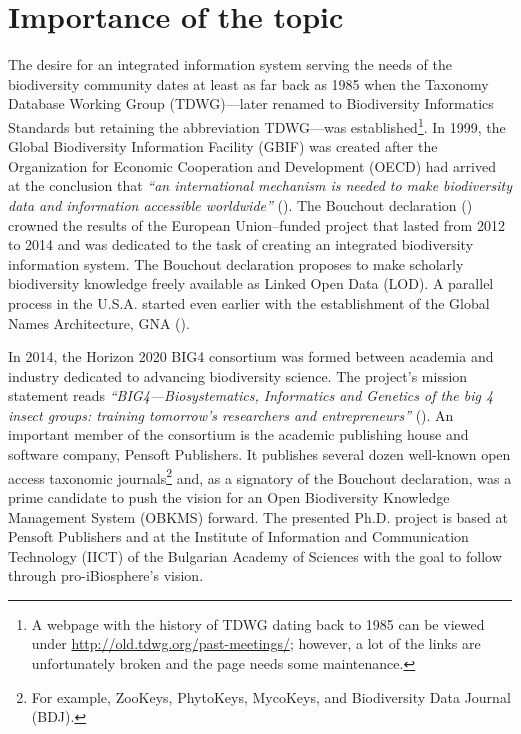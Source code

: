\label{chapter-introduction} 
\newcommand{\keyword}[1]{\textbf{#1}}
\newcommand{\tabhead}[1]{\textbf{#1}}
\newcommand{\code}[1]{\texttt{#1}}
\newcommand{\file}[1]{\texttt{\bfseries#1}}
\newcommand{\option}[1]{\texttt{\itshape#1}}
\section*{Importance of the topic}

The desire for an integrated information system serving the needs of the biodiversity community dates at least as far back as 1985 when the Taxonomy Database Working Group (TDWG)---later renamed to Biodiversity Informatics Standards but retaining the abbreviation TDWG---was established\footnote{A webpage with the history of TDWG dating back to 1985 can be viewed under \url{http://old.tdwg.org/past-meetings/}; however, a lot of the links are unfortunately broken and the page needs some maintenance.}. In 1999, the Global Biodiversity Information Facility (GBIF) was created after the Organization for Economic Cooperation and Development (OECD) had arrived at the conclusion that \emph{``an international mechanism is needed to make biodiversity data and information accessible worldwide''} (\cite{noauthor_what_nodate}).  The Bouchout declaration (\cite{noauthor_bouchout_2014}) crowned the results of the European Union--funded project \cite{noauthor_pro-ibiosphere_nodate} that lasted from 2012 to 2014 and was dedicated to the task of creating an integrated biodiversity information system. The Bouchout declaration proposes to make scholarly biodiversity knowledge freely available as Linked Open Data (LOD).  A parallel process in the U.S.A. started even earlier with the establishment of the Global Names Architecture, GNA (\cite{patterson_names_2010,pyle_towards_2016}).

In 2014, the Horizon 2020 BIG4 consortium was formed between academia and industry dedicated to advancing biodiversity science.  The project's mission statement reads \emph{``BIG4---Biosystematics, Informatics and Genetics of the big 4 insect groups: training tomorrow's researchers and entrepreneurs''} (\cite{university_of_copenhagen_big4_2014}). An important member of the consortium is the academic publishing house and software company, Pensoft Publishers. It publishes several dozen well-known open access taxonomic journals\footnote{For example, ZooKeys, PhytoKeys, MycoKeys, and Biodiversity Data Journal (BDJ).} and, as a signatory of the Bouchout declaration, was a prime candidate to push the vision for an Open Biodiversity Knowledge Management System (OBKMS) forward. The presented Ph.D. project is based at Pensoft Publishers and at the Institute of Information and Communication Technology (IICT) of the Bulgarian Academy of Sciences with the goal to follow through pro-iBiosphere's vision.


